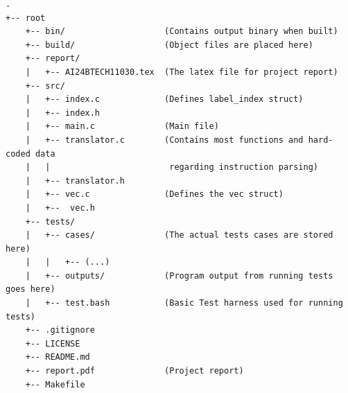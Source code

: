 \documentclass[12pt]{article}
\begin{document}
    \begin{verbatim}
.
+-- root
    +-- bin/                    (Contains output binary when built)
    +-- build/                  (Object files are placed here)
    +-- report/
    |   +-- AI24BTECH11030.tex  (The latex file for project report)
    +-- src/
    |   +-- index.c             (Defines label_index struct)
    |   +-- index.h
    |   +-- main.c              (Main file)
    |   +-- translator.c        (Contains most functions and hard-coded data 
    |   |                        regarding instruction parsing)
    |   +-- translator.h
    |   +-- vec.c               (Defines the vec struct)
    |   +--  vec.h
    +-- tests/
    |   +-- cases/              (The actual tests cases are stored here)
    |   |   +-- (...)
    |   +-- outputs/            (Program output from running tests goes here)
    |   +-- test.bash           (Basic Test harness used for running tests)
    +-- .gitignore
    +-- LICENSE
    +-- README.md
    +-- report.pdf              (Project report)
    +-- Makefile\end{verbatim}
    
\end{document}
